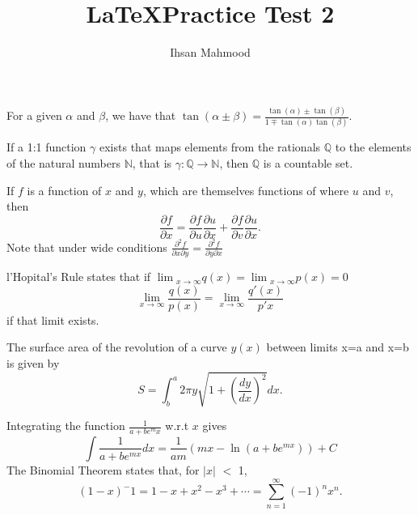 \documentclass[12pt,a4paper]{article}
\begin{document}
\title{\LaTeX Practice Test 2}
\author{Ihsan Mahmood}
\maketitle

\par For a given $\alpha$ and $\beta$, we have that $\displaystyle \tan(\alpha \pm \beta) = \frac{\tan(\alpha) \pm\tan(\beta)}{1 \mp \tan(\alpha)\tan(\beta)}$.

\par 	If a 1:1 function $\gamma$ exists that maps elements from the rationals $\mathbb{Q}$ to the elements of the natural numbers $\mathbb{N}$, that is $\gamma : \mathbb{Q} \rightarrow \mathbb{N}$, then $\mathbb{Q}$ is a countable set.

\par If $f$ is a function of $x$ and $y$, which are themselves functions of where $u$ and $v$, then
\begin{equation} 
  \frac{\partial f}{\partial x}=\frac{\partial f}{\partial u}\frac{\partial u}     {\partial x} + \frac{\partial f}{\partial v}\frac{\partial u}{\partial x}.
\end{equation}
Note that under wide conditions $\displaystyle \frac{\partial ^2 f}{\partial x\partial  y}=\frac{\partial ^2 f}{\partial y\partial x}$ 

\par l'Hopital's Rule states that if $\displaystyle \lim{_{x \rightarrow \infty}} q(x)= \lim{_{x \rightarrow \infty}} p(x)=0$
\begin{equation} \lim_{x \rightarrow \infty} \frac{q(x)}{p(x)}=\lim_{x \rightarrow \infty} \frac{q'(x)}{p'{x}}
\end{equation}
if that limit exists.
\par{ \parskip=0mm \parindent=6mm The surface area of the revolution of a curve $y(x)$ between limits x=a and x=b is given by}
\begin{equation*}
S= \int^a _b 2\pi y \sqrt{1+ (\frac{dy}{dx})^2} dx.
\end{equation*}
\par Integrating the function $\displaystyle \frac{1}{a+be^mx}$ w.r.t $x$ gives 
\begin{equation} \int \frac{1}{a+be^{mx}}dx=\frac{1}{am}(mx- \ln(a+be^{mx}))+ C
\end{equation}
The Binomial Theorem states that, for $|x|$ $<$ 1,
\begin{equation} (1-x)^-1=1-x+x^2-x^3+ \cdots = \sum^\infty_{n=1}(-1)^nx^n.
\end{equation}
\end{document}
